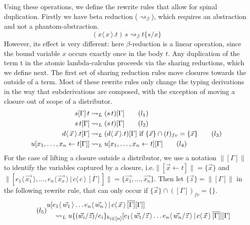 \documentclass[a4paper,UKenglish,cleveref, autoref]{lipics-v2019}
\newcommand{\fv}[1]{(#1)_{fv}}
\newcommand{\set}[1]{ \{ #1 \} }
\newcommand{\app}[2]{#1 \, #2}
\newcommand{\fake}[3]{#1 \langle \, #2 \, \rangle . #3}
\newcommand{\share}[3]{#1 [#2 \leftarrow #3]}
\newcommand{\dist}[5]{#1 [ #2 \, \vert \, \fakedist{#4}{#5} \, #3 ]}
\newcommand{\fakedist}[2]{#1 \langle \, #2 \, \rangle}
\newcommand{\sub}[3]{#1 \{ #2 / #3 \}}
\newcommand{\psub}[3]{#1 \{ #2 / #3 \}_{b}}
\newcommand{\bindvars}[1]{\parallel#1\parallel}
\begin{document}
Using these operations, we define the rewrite rules that allow for spinal duplication. Firstly we have beta reduction ($\rightsquigarrow_{\beta}$), which requires an abstraction and not a phantom-abstraction.
\begin{equation}  \label{red:beta} \tag{$\beta$}
\app{(\fake{x}{x}{t})}{s} \rightsquigarrow_{\beta} \sub{t}{s}{x}
\end{equation}
However, its effect is very different: here $\beta$-reduction is a linear operation, since the bound variable $x$ occurs exactly once in the body $t$. Any duplication of the term t in the atomic lambda-calculus proceeds via the sharing reductions, which we define next. The first set of sharing reduction rules move closures towards the outside of a term. Most of these rewrite rules only change the typing derivations in the way that subderivations are composed, with the exception of moving a closure out of scope of a distributor.
\begin{align}
\app{s[\Gamma]}{t} &\rightsquigarrow_{L} (\app{s}{t})[\Gamma]   \label{red:liftappleft} \tag{$l_{1}$} \\
\app{s}{t[\Gamma]} &\rightsquigarrow_{L} (\app{s}{t})[\Gamma] \label{red:liftappright} \tag{$l_{2}$} \\
\fake{d}{\vec{x}}{t[\Gamma]} &\rightsquigarrow_{L} (\fake{d}{\vec{x}}{t})[\Gamma]  \text{ if } \set{\vec{x}} \cap \fv{t} = \set{\vec{x}}  \label{red:liftabs} \tag{$l_{3}$} \\
\share{u}{x_{1}, \dots, x_{n}}{t[\Gamma]} &\rightsquigarrow_{L} \share{u}{x_{1}, \dots, x_{n}}{t}[\Gamma] \label{red:liftshare} \tag{$l_{4}$}
\end{align}
For the case of lifting a closure outside a distributor, we use a notation $\bindvars{[\Gamma]}$ to identify the variables captured by a closure, i.e.$\bindvars{\share{}{\vec{x}}{t}} = \set{\vec{x}}$ and $\bindvars{\dist{}{\fakedist{e_{1}}{\vec{x_{1}}}, \dots, \fakedist{e_{n}}{\vec{x_{x}}}}{\overline{[\Gamma]}}{c}{c}} = \set{\vec{x_{1}}, \dots, \vec{x_{n}}}$. Then let $\set{\vec{z}} = \bindvars{[\Gamma]}$ in the following rewrite rule, that can only occur if $\set{\vec{x}} \cap \fv{[\Gamma]} = \set{}$.
\begin{equation} \label{red:distshare} \tag{$l_{5}$}
\begin{multlined}
\dist{u}{\fakedist{e_{1}}{\vec{w_{1}}} \dots \fakedist{e_{n}}{\vec{w_{n}}}}{\overline{[\Gamma]} [\Gamma]}{c}{\vec{x}} \\ \rightsquigarrow_{L} \dist{u {\psub{}{(\vec{w_{i}} / \vec{z})}{e_{i}}}_{i \in [n]}}{\fakedist{e_{1}}{\vec{w_{1}} / \vec{z}} \dots \fakedist{e_{n}}{\vec{w_{n}} / \vec{z}}}{\overline{[\Gamma]}}{c}{\vec{x}}[\Gamma]
\end{multlined}
\end{equation}
\end{document}
